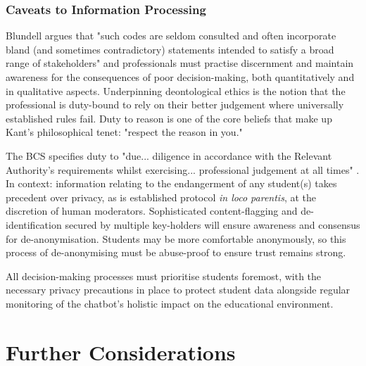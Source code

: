 \documentclass[14pt,a4paper]{article}
\begin{document}
\begin{multicols}{2}
\subsubsection*{Caveats to Information Processing}
Blundell argues that "such codes are seldom consulted and often incorporate bland (and sometimes contradictory) statements intended to satisfy a broad range of stakeholders" \textit{\parencite[p. 40]{Blundell2020}} and professionals must practise discernment and maintain awareness for the consequences of poor decision-making, both quantitatively and in qualitative aspects.
Underpinning deontological ethics is the notion that the professional is duty-bound to rely on their better judgement where universally established rules fail.
Duty to reason is one of the core beliefs that make up Kant's philosophical tenet: "respect the reason in you."

The BCS specifies duty to "due... diligence in accordance with the Relevant Authority's requirements whilst exercising... professional judgement at all times" \textit{\parencite[p. 2]{BCS2024}}.
In context: information relating to the endangerment of any student(s) takes precedent over privacy, as is established protocol \textit{in loco parentis}, at the discretion of human moderators.
Sophisticated content-flagging and de-identification secured by multiple key-holders will ensure awareness and consensus for de-anonymisation.
Students may be more comfortable anonymously, so this process of de-anonymising must be abuse-proof to ensure trust remains strong.

All decision-making processes must prioritise students foremost, with the necessary privacy precautions in place to protect student data alongside regular monitoring of the chatbot's holistic impact on the educational environment.

\section{Further Considerations}



\end{multicols}
\end{document}
